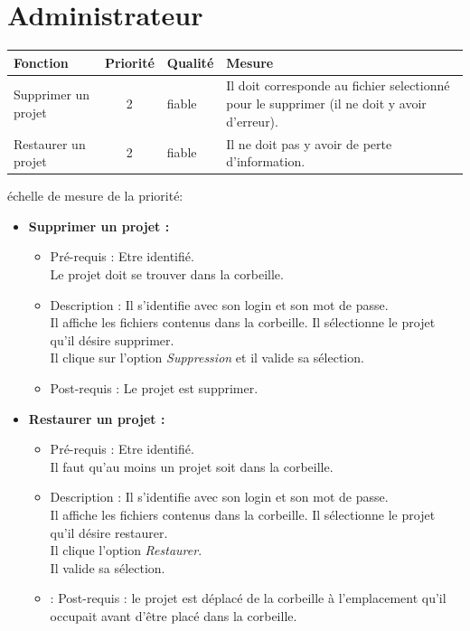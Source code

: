 \section*{Administrateur}

\begin{tabular}{|p{4cm}|c|p{4cm}|p{5cm}|}
\hline
Fonction & Priorit{\'e} & Qualit{\'e} & Mesure \\
\hline
Supprimer un projet & 2 & fiable & Il doit corresponde au fichier selectionn{\'e} pour le supprimer (il ne doit y avoir d'erreur).\\
\hline
Restaurer un projet & 2 & fiable & Il ne doit pas y avoir de perte d'information.\\
\hline
\end{tabular}

\begin{center}
{\'e}chelle de mesure de la priorit{\'e}:

\end{center}

\begin{itemize}
\item  {\bf Supprimer un projet :}
	\begin{itemize}
	\item Pr{\'e}-requis : Etre identifi{\'e}.\\
	Le projet doit se trouver dans la corbeille.
	\item Description : Il s'identifie avec son login et son mot de passe.\\
	Il affiche les fichiers contenus dans la corbeille. Il s{\'e}lectionne le projet qu'il d{\'e}sire supprimer.\\
	Il clique sur l'option {\it Suppression} et il valide sa s{\'e}lection.
	\item Post-requis : Le projet est supprimer.\\
	\end{itemize}

\item  {\bf Restaurer un projet :}
	\begin{itemize}
	\item Pr{\'e}-requis : Etre identifi{\'e}.\\
	Il faut qu'au moins un projet soit dans la corbeille.
	\item Description : Il s'identifie avec son login et son mot de passe.\\
	Il affiche les fichiers contenus dans la corbeille. Il s{\'e}lectionne le projet qu'il d{\'e}sire restaurer.\\
	Il clique l'option {\it Restaurer}.\\
	Il valide sa s{\'e}lection.
	\item : Post-requis : le projet est d{\'e}plac{\'e} de la corbeille {\`a} l'emplacement qu'il occupait avant d'{\^e}tre plac{\'e} dans la corbeille.\\
	\end{itemize}
\end{itemize}
